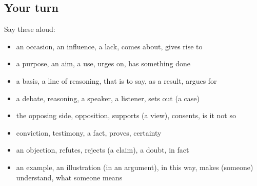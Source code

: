 \subsection*{Your turn}
Say these aloud:

\begin{itemize}
\raggedright
  \item an occasion, an influence, a lack, comes about, gives rise to
  \item a purpose, an aim, a use, urges on, has something done
  \item a basis, a line of reasoning, that is to say, as a result, argues for
  \item a debate, reasoning, a speaker, a listener, sets out (a case)
  \item the opposing side, opposition, supports (a view), consents, is it not so
  \item conviction, testimony, a fact, proves, certainty
  \item an objection, refutes, rejects (a claim), a doubt, in fact
  \item an example, an illustration (in an argument), in this way, makes (someone) understand, what someone means
\end{itemize}

